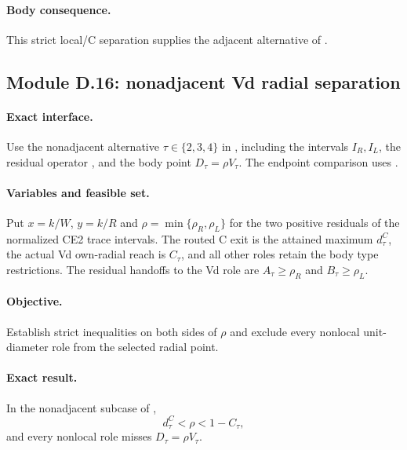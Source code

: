 \paragraph{Body consequence.}
This strict local/C separation supplies the adjacent alternative of
.

\subsection{Module D.16: nonadjacent Vd radial separation}

\paragraph{Exact interface.}
Use the nonadjacent alternative $\tau\in\{2,3,4\}$ in
, including the intervals $I_R,I_L$,
the residual operator , and the body point
$D_\tau=\rho V_\tau$.  The endpoint comparison uses
.

\paragraph{Variables and feasible set.}
Put $x=k/W$, $y=k/R$ and
$\rho=\min\{\rho_R,\rho_L\}$ for the two positive residuals of the normalized
CE2 trace intervals.  The routed C exit is the attained maximum
$d_\tau^C$, the actual Vd own-radial reach is $C_\tau$, and all other roles
retain the body type restrictions.  The residual handoffs to the Vd role are
$A_\tau\ge\rho_R$ and $B_\tau\ge\rho_L$.

\paragraph{Objective.}
Establish strict inequalities on both sides of $\rho$ and exclude every
nonlocal unit-diameter role from the selected radial point.

\paragraph{Exact result.}

\begin{lemma}
\label{lem:app-nonadjacent-vd-separation}
In the nonadjacent subcase of
,
\[
 d_\tau^C<\rho<1-C_\tau,
\]
and every nonlocal role misses $D_\tau=\rho V_\tau$.
\end{lemma}

